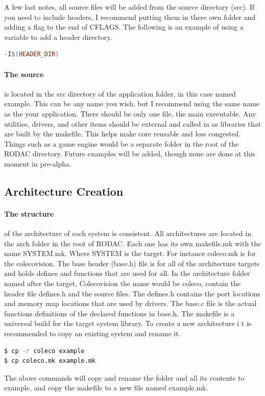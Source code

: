 \documentclass{article}
\begin{document}
  A few last notes, all source files will be added from the source directory (src). If you need to include headers, I recommend putting them in there own folder and adding a flag to the end of CFLAGS.
  The following is an example of using a variable to add a header directory.

  \begin{lstlisting}[language=make]
-I$(HEADER_DIR)
  \end{lstlisting}

  \paragraph{The source}is located in the src directory of the application folder, in this case named example. This can be any name you wish, but I recommend using the same name as the your application.
  There should be only one file, the main executable. Any utilities, drivers, and other items should be external and called in as libraries that are built by the makefile. This helps make core reusable
  and less congested. Things such as a game engine would be a separate folder in the root of the RODAC directory. Future examples will be added, though none are done at this moment in pre-alpha.

  \subsection{Architecture Creation}

  \paragraph{The structure}of the architecture of each system is consistent. All architectures are located in the arch folder in the root of RODAC.
  Each one has its own makefile.mk with the name SYSTEM.mk. Where SYSTEM is the target. For instance coleco.mk is for the colecovision. The base header (base.h)
  file is for all of the architecture targets and holds defines and functions that are used for all. In the architecture folder named after the target, Colecovision the name would be coleco,
  contain the header file defines.h and the source files. The defines.h contains the port locations and memory map locations that are used by drivers. The base.c file
  is the actual functions definitions of the declared functions in base.h. The makefile is a universal build for the target system library. To create a new architecture i
  t is recommended to copy an existing system and rename it.
  \begin{lstlisting}[language=bash]
$ cp -r coleco example
$ cp coleco.mk example.mk
  \end{lstlisting}
  The above commands will copy and rename the folder and all its contents to example, and copy the makefile to a new file named example.mk.
\end{document}

